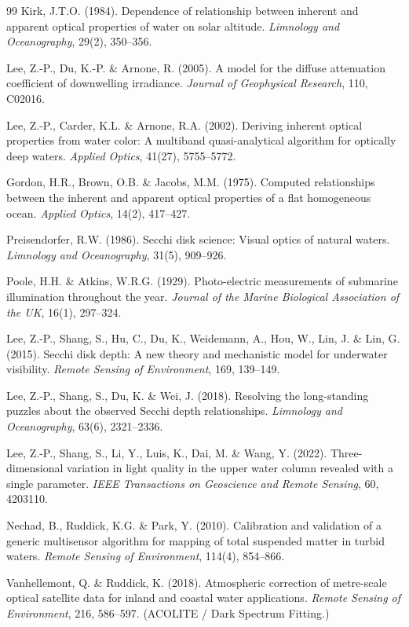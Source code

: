 \documentclass[11pt,a4paper]{article}
\begin{document}
\begin{thebibliography}{99}
 Kirk, J.T.O. (1984). Dependence of relationship between inherent
and apparent optical properties of water on solar altitude. \emph{Limnology and
Oceanography}, 29(2), 350--356.

 Lee, Z.-P., Du, K.-P. \& Arnone, R. (2005). A model for the
diffuse attenuation coefficient of downwelling irradiance. \emph{Journal of
Geophysical Research}, 110, C02016.

 Lee, Z.-P., Carder, K.L. \& Arnone, R.A. (2002). Deriving inherent
optical properties from water color: A multiband quasi-analytical algorithm for
optically deep waters. \emph{Applied Optics}, 41(27), 5755--5772.

 Gordon, H.R., Brown, O.B. \& Jacobs, M.M. (1975). Computed
relationships between the inherent and apparent optical properties of a flat
homogeneous ocean. \emph{Applied Optics}, 14(2), 417--427.

 Preisendorfer, R.W. (1986). Secchi disk science: Visual
optics of natural waters. \emph{Limnology and Oceanography}, 31(5), 909--926.

 Poole, H.H. \& Atkins, W.R.G. (1929). Photo-electric measurements of
submarine illumination throughout the year. \emph{Journal of the Marine Biological
Association of the UK}, 16(1), 297--324.

 Lee, Z.-P., Shang, S., Hu, C., Du, K., Weidemann, A., Hou, W.,
Lin, J. \& Lin, G. (2015). Secchi disk depth: A new theory and mechanistic model for
underwater visibility. \emph{Remote Sensing of Environment}, 169, 139--149.

 Lee, Z.-P., Shang, S., Du, K. \& Wei, J. (2018). Resolving the
long-standing puzzles about the observed Secchi depth relationships. \emph{Limnology
and Oceanography}, 63(6), 2321--2336.

 Lee, Z.-P., Shang, S., Li, Y., Luis, K., Dai, M. \& Wang, Y.
(2022). Three-dimensional variation in light quality in the upper water column
revealed with a single parameter. \emph{IEEE Transactions on Geoscience and Remote
Sensing}, 60, 4203110.

 Nechad, B., Ruddick, K.G. \& Park, Y. (2010). Calibration and
validation of a generic multisensor algorithm for mapping of total suspended matter
in turbid waters. \emph{Remote Sensing of Environment}, 114(4), 854--866.

 Vanhellemont, Q. \& Ruddick, K. (2018). Atmospheric correction
of metre-scale optical satellite data for inland and coastal water applications.
\emph{Remote Sensing of Environment}, 216, 586--597. (ACOLITE / Dark Spectrum
Fitting.)


\end{thebibliography}
\end{document}
